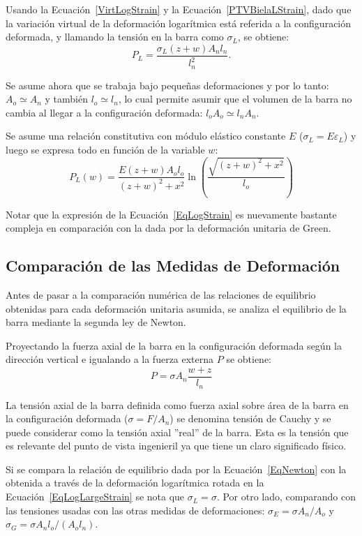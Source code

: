 Usando la Ecuación~\eqref{VirtLogStrain} y la Ecuación~\eqref{PTVBielaLStrain}, dado que la variación virtual de la deformación logarítmica está referida a la configuración deformada, y llamando la tensión en la barra como $\sigma_L$, se obtiene:
%
\begin{equation}\label{EqLogLargeStrain}
	P_L = \frac{\sigma_L(z+w)A_nl_n}{l_n^2}.
\end{equation}

Se asume ahora que se trabaja bajo pequeñas deformaciones y por lo tanto: $A_o \simeq A_n$ y también $l_o \simeq l_n$, lo cual permite asumir que el volumen de la barra no cambia al llegar a la configuración deformada: $l_o A_o \simeq l_n A_n$. 

Se asume una relación constitutiva con módulo elástico constante $E$ ($\sigma_L = E \varepsilon_L$) y luego se expresa todo en función de la variable $w$:
%
\begin{equation}\label{EqLogStrain}
	\boxed{
		P_L(w) = \frac{E(z+w)A_ol_o}{(z+w)^2+x^2}\ln\left(\frac{\sqrt{(z+w)^2+x^2}}{l_o}\right)
	}
\end{equation}

Notar que la expresión de la Ecuación~\eqref{EqLogStrain} es nuevamente bastante compleja en comparación con la dada por la deformación unitaria de Green.

\subsection{Comparación de las Medidas de Deformación}

Antes de pasar a la comparación numérica de las relaciones de equilibrio obtenidas para cada deformación unitaria asumida, se analiza el equilibrio de la barra mediante la segunda ley de Newton.

Proyectando la fuerza axial de la barra en la configuración deformada según la dirección vertical e igualando a la fuerza externa $P$ se obtiene:
%
\begin{equation}\label{EqNewton}
	P = \sigma A_n \frac{w+z}{l_n}
\end{equation}

La tensión axial de la barra definida como fuerza axial sobre área de la barra en la configuración deformada ($\sigma = F / A_n$) se denomina tensión de Cauchy y se puede considerar como la tensión axial ''real'' de la barra. Esta es la tensión que es relevante del punto de vista ingenieril ya que tiene un claro significado físico.

Si se compara la relación de equilibrio dada por la Ecuación~\eqref{EqNewton} con la obtenida a través de la deformación logarítmica rotada en la Ecuación~\eqref{EqLogLargeStrain} se nota que $\sigma_L=\sigma$. %
%
Por otro lado, comparando con las tensiones usadas con las otras medidas de deformaciones: $\sigma_E = \sigma A_n / A_o$ y $\sigma_G = \sigma A_nl_o/(A_ol_n)$.

